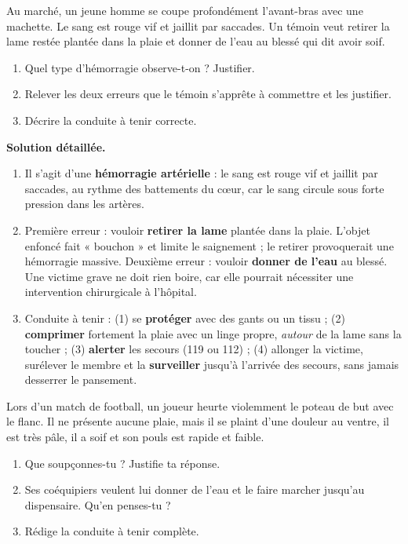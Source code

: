 \documentclass[11pt]{article}
\begin{document}
\begin{exoresolu}
Au marché, un jeune homme se coupe profondément l'avant-bras avec une machette. Le sang est rouge vif et jaillit par saccades. Un témoin veut retirer la lame restée plantée dans la plaie et donner de l'eau au blessé qui dit avoir soif.
\begin{enumerate}
\item Quel type d'hémorragie observe-t-on ? Justifier.
\item Relever les deux erreurs que le témoin s'apprête à commettre et les justifier.
\item Décrire la conduite à tenir correcte.
\end{enumerate}
\tcblower
\textbf{Solution détaillée.}
\begin{enumerate}
\item Il s'agit d'une \textbf{hémorragie artérielle} : le sang est rouge vif et jaillit par saccades, au rythme des battements du cœur, car le sang circule sous forte pression dans les artères.
\item Première erreur : vouloir \textbf{retirer la lame} plantée dans la plaie. L'objet enfoncé fait « bouchon » et limite le saignement ; le retirer provoquerait une hémorragie massive. Deuxième erreur : vouloir \textbf{donner de l'eau} au blessé. Une victime grave ne doit rien boire, car elle pourrait nécessiter une intervention chirurgicale à l'hôpital.
\item Conduite à tenir : (1) se \textbf{protéger} avec des gants ou un tissu ; (2) \textbf{comprimer} fortement la plaie avec un linge propre, \emph{autour} de la lame sans la toucher ; (3) \textbf{alerter} les secours (119 ou 112) ; (4) allonger la victime, surélever le membre et la \textbf{surveiller} jusqu'à l'arrivée des secours, sans jamais desserrer le pansement.
\end{enumerate}
\end{exoresolu}

\begin{exercice}
Lors d'un match de football, un joueur heurte violemment le poteau de but avec le flanc. Il ne présente aucune plaie, mais il se plaint d'une douleur au ventre, il est très pâle, il a soif et son pouls est rapide et faible.
\begin{enumerate}
\item Que soupçonnes-tu ? Justifie ta réponse.
\item Ses coéquipiers veulent lui donner de l'eau et le faire marcher jusqu'au dispensaire. Qu'en penses-tu ?
\item Rédige la conduite à tenir complète.
\end{enumerate}
\end{exercice}
\end{document}
